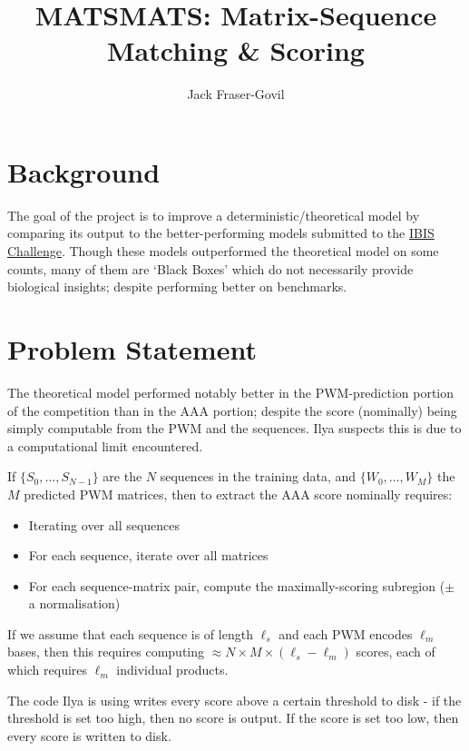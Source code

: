 \documentclass[a4paper,9pt]{article}
\title{MATSMATS: Matrix-Sequence Matching \& Scoring}
\author{Jack Fraser-Govil}
\begin{document}
	\maketitle

	\section{Background}

		The goal of the project is to improve a deterministic/theoretical model by comparing its output to the better-performing models submitted to the \href{{https://ibis.autosome.org/home}}{IBIS Challenge}. Though these models outperformed the theoretical model on some counts, many of them are `Black Boxes' which do not necessarily provide biological insights; despite performing better on benchmarks. 


		
	\section{Problem Statement}

		The theoretical model performed notably better in the PWM-prediction portion of the competition than in the AAA portion; despite the score (nominally) being simply computable from the PWM and the sequences. Ilya suspects this is due to a computational limit encountered. 

		If $\{S_0,...,S_{N-1}\}$ are the $N$ sequences in the training data, and $\{W_0,...,W_M\}$ the $M$ predicted PWM matrices, then to extract the AAA score nominally requires:
		\begin{itemize}
			\item Iterating over all sequences
			\item For each sequence, iterate over all matrices
			\item For each sequence-matrix pair, compute the maximally-scoring subregion ($\pm$ a normalisation)
		\end{itemize}
		If we assume that each sequence is of length $\ell_s$ and each PWM encodes $\ell_m$ bases, then this requires computing $\approx N \times M \times (\ell_s - \ell_m)$ scores, each of which requires $\ell_m$ individual products.

		The code Ilya is using writes every score above a certain threshold to disk - if the threshold is set too high, then no score is output. If the score is set too low, then every score is written to disk.
\end{document}

